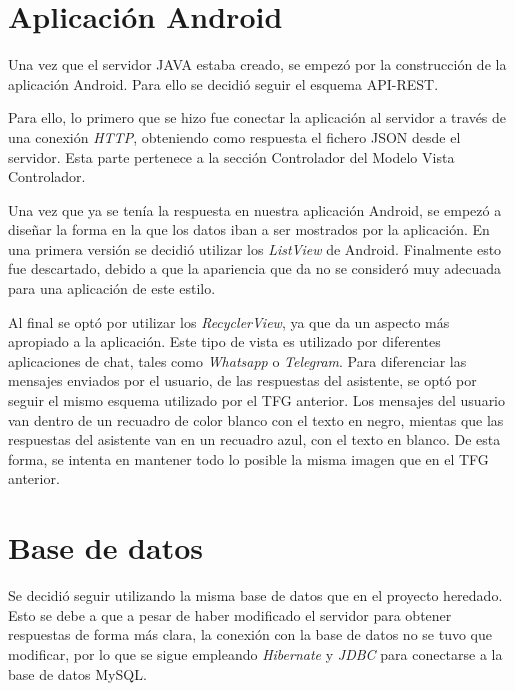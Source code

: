 \section{Aplicación Android}

Una vez que el servidor JAVA estaba creado, se empezó por la construcción de la aplicación Android. Para ello se decidió seguir el esquema API-REST.


Para ello, lo primero que se hizo fue conectar la aplicación al servidor a través de una conexión \textit{HTTP}, obteniendo como respuesta el fichero JSON desde el servidor. Esta parte pertenece a la sección Controlador del Modelo Vista Controlador.

Una vez que ya se tenía la respuesta en nuestra aplicación Android, se empezó a diseñar la forma en la que los datos iban a ser mostrados por la aplicación. En una primera versión se decidió utilizar los \textit{ListView} de Android. Finalmente esto fue descartado, debido a que la apariencia que da no se consideró muy adecuada para una aplicación de este estilo.


Al final se optó por utilizar los \textit{RecyclerView}, ya que da un aspecto más apropiado a la aplicación. Este tipo de vista es utilizado por diferentes aplicaciones de chat, tales como \textit{Whatsapp} o \textit{Telegram}. Para diferenciar las mensajes enviados por el usuario, de las respuestas del asistente, se optó por seguir el mismo esquema utilizado por el TFG anterior. Los mensajes del usuario van dentro de un recuadro de color blanco con el texto en negro, mientas que las respuestas del asistente van en un recuadro azul, con el texto en blanco. De esta forma, se intenta en mantener todo lo posible la misma imagen que en el TFG anterior.

\section{Base de datos}

Se decidió seguir utilizando la misma base de datos que en el proyecto heredado. Esto se debe a que a pesar de haber modificado el servidor para obtener respuestas de forma más clara, la conexión con la base de datos no se tuvo que modificar, por lo que se sigue empleando \textit{Hibernate} y \textit{JDBC} para conectarse a la base de datos MySQL.

